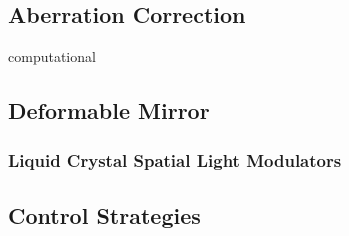 \subsection{Aberration Correction}
\label{sec:AberrationCorrection}
computational

\subsection{Deformable Mirror }
\label{sec:DeformableMirror}

\subsubsection{Liquid Crystal Spatial Light Modulators}
\label{sec:LiquidCrystalSpatialLightModulators}

\subsection{Control Strategies}
\label{sec:ControlStrategies}

\clearpage